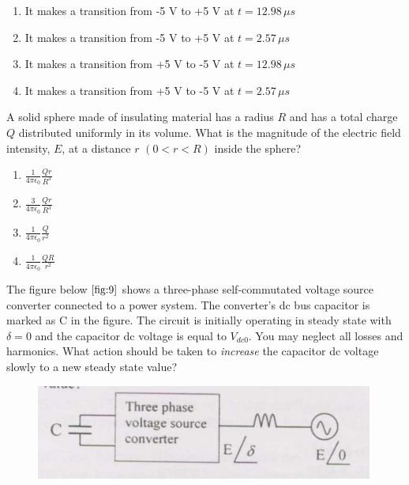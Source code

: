     \begin{enumerate}
        \item It makes a transition from -5 V to +5 V at $t = 12.98 \, \mu s$
        \item It makes a transition from -5 V to +5 V at $t = 2.57 \, \mu s$
        \item It makes a transition from +5 V to -5 V at $t = 12.98 \, \mu s$
        \item It makes a transition from +5 V to -5 V at $t = 2.57 \, \mu s$
    \end{enumerate}
    \bigskip
    \item A solid sphere made of insulating material has a radius $R$ and has a total charge $Q$ distributed uniformly in its volume. What is the magnitude of the electric field intensity, $E$, at a distance $r$ $(0 < r < R)$ inside the sphere?
    \begin{multicols}{4}
    \begin{enumerate}
        \item $\frac{1}{4 \pi \epsilon_0} \frac{Qr}{R^3}$
        \item $\frac{3}{4 \pi \epsilon_0} \frac{Qr}{R^3}$
        \item $\frac{1}{4 \pi \epsilon_0} \frac{Q}{r^2}$
        \item $\frac{1}{4 \pi \epsilon_0} \frac{QR}{r^2}$
   \end{enumerate}
   \end{multicols}
   \bigskip
   \item The figure below $\ref{fig:9}$ shows a three-phase self-commutated voltage source converter connected to a power system. The converter's dc bus capacitor is marked as C in the figure. The circuit is initially operating in steady state with $\delta = 0$ and the capacitor dc voltage is equal to $V_{dc0}$. You may neglect all losses and harmonics. What action should be taken to \textit{increase} the capacitor dc voltage slowly to a new steady state value?
   \begin{figure}[!ht]
    \centering
    \includegraphics[width=\linewidth]{GATE-yearwise/GATE(1)/figs/9.png}
    \caption{}
    \label{fig:9}
   \end{figure}

